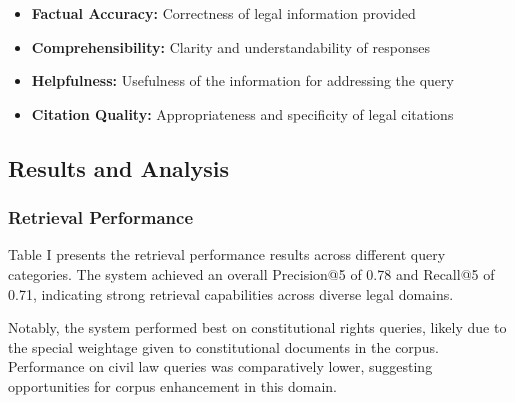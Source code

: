 \documentclass[conference]{IEEEtran}
\begin{document}
\begin{itemize}
    \item \textbf{Factual Accuracy:} Correctness of legal information provided
    \item \textbf{Comprehensibility:} Clarity and understandability of responses
    \item \textbf{Helpfulness:} Usefulness of the information for addressing the query
    \item \textbf{Citation Quality:} Appropriateness and specificity of legal citations
\end{itemize}

\subsection{Results and Analysis}

\subsubsection{Retrieval Performance}

Table I presents the retrieval performance results across different query categories. The system achieved an overall Precision@5 of 0.78 and Recall@5 of 0.71, indicating strong retrieval capabilities across diverse legal domains.

\begin{table}[ht]
\caption{Retrieval Performance Across Query Categories}
\label{tab:retrieval}
\begin{center}
\end{center}
\end{table}

Notably, the system performed best on constitutional rights queries, likely due to the special weightage given to constitutional documents in the corpus. Performance on civil law queries was comparatively lower, suggesting opportunities for corpus enhancement in this domain.
\end{document}
